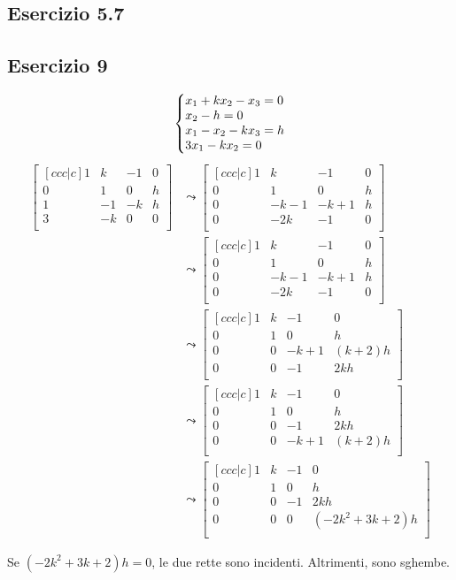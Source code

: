 \documentclass{article}
\makeatletter
\newcommand*{\sys}[1]{\left\{\begin{array}{@{}l@{}}#1\end{array}\right.}
\newcommand*{\m}[1]{\begin{bmatrix}#1\end{bmatrix}}
\makeatother
\begin{document}
\subsection*{Esercizio 5.7}

\pagebreak
\subsection*{Esercizio 9}
\[\sys{
    x_1 + kx_2 - x_3 = 0\\
    x_2 - h = 0\\
    x_1 - x_2 - kx_3 = h\\
    3x_1 - kx_2 = 0\\
}\]
\[\begin{aligned}
\m{[ccc|c]
    1 & k & -1 & 0 \\
    0 & 1 & 0 & h \\
    1 & -1 & -k & h \\
    3 & -k & 0 & 0 \\
}&\leadsto\m{[ccc|c]
    1 & k & -1 & 0 \\
    0 & 1 & 0 & h \\
    0 & -k-1 & -k+1 & h \\
    0 & -2k & -1 & 0 \\
}\\&\leadsto\m{[ccc|c]
    1 & k & -1 & 0 \\
    0 & 1 & 0 & h \\
    0 & -k-1 & -k+1 & h \\
    0 & -2k & -1 & 0 \\
}\\&\leadsto\m{[ccc|c]
    1 & k & -1 & 0 \\
    0 & 1 & 0 & h \\
    0 & 0 & -k+1 & (k+2)h \\
    0 & 0 & -1 & 2kh \\
}\\&\leadsto\m{[ccc|c]
    1 & k & -1 & 0 \\
    0 & 1 & 0 & h \\
    0 & 0 & -1 & 2kh \\
    0 & 0 & -k+1 & (k+2)h \\
}\\&\leadsto\m{[ccc|c]
    1 & k & -1 & 0 \\
    0 & 1 & 0 & h \\
    0 & 0 & -1 & 2kh \\
    0 & 0 & 0 & (-2k^2+3k+2)h \\
}
\end{aligned}\]

Se $(-2k^2+3k+2)h = 0$, le due rette sono incidenti.
Altrimenti, sono sghembe.
\end{document}
